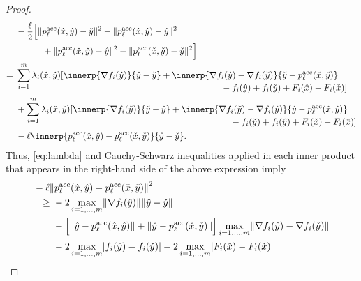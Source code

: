 \documentclass[../main]{subfiles}
\begin{document}
\begin{proof}
\begin{align}
             &- \frac{\ell}{2} 
             \begin{multlined}[t]
                 \Big[  \norm{p^\acc_\ell(\hat{x}, \hat{y}) - \check{y}}^2 - \norm{p^\acc_\ell(\hat{x}, \hat{y}) - \hat{y}}^2 \\
                  + \norm{p^\acc_\ell(\check{x}, \check{y}) - \hat{y}}^2 - \norm{p^\acc_\ell(\check{x}, \check{y}) - \check{y}}^2 \Big]
             \end{multlined} \\
        ={} & \sum_{i = 1}^{m} \lambda_i(\hat{x}, \hat{y})
        \begin{multlined}[t]
            [ \innerp{\nabla f_i(\hat{y})}{\hat{y}- \check{y}} + \innerp{\nabla f_i(\hat{y}) - \nabla f_i(\check{y})}{\check{y} - p^\acc_\ell(\check{x}, \check{y})} \\
            - f_i(\hat{y}) + f_i(\check{y}) + F_i(\hat{x}) - F_i(\check{x}) ] 
        \end{multlined} \\
        &+ \sum_{i = 1}^{m} \lambda_i(\check{x}, \check{y})
        \begin{multlined}[t]
            [ \innerp{\nabla f_i(\check{y})}{\check{y}- \hat{y}} + \innerp{\nabla f_i(\check{y}) - \nabla f_i(\hat{y})}{\hat{y} - p^\acc_\ell(\hat{x}, \hat{y})} \\
            - f_i(\check{y}) + f_i(\hat{y}) + F_i(\check{x}) - F_i(\hat{x}) ]
        \end{multlined} \\
        &- \ell \innerp{p^\acc_\ell(\hat{x}, \hat{y}) - p^\acc_\ell(\check{x}, \check{y})}{\hat{y} - \check{y}}
    .\end{align}
    Thus, \cref{eq:lambda} and Cauchy-Schwarz inequalities applied in each inner product that appears in the right-hand side of the above expression imply
    \begin{align}
        \MoveEqLeft - \ell \norm*{p^\acc_\ell(\hat{x}, \hat{y}) - p^\acc_\ell(\check{x}, \check{y})}^2 \\
        \ge{} & - 2 \max_{i = 1, \dots, m} \norm{\nabla f_i(\hat{y})} \norm{\hat{y} - \check{y}} \\
              &- \Big[ \norm{\hat{y} - p^\acc_\ell(\hat{x}, \hat{y})} + \norm{\check{y} - p^\acc_\ell(\check{x}, \check{y})} \Big] \max_{i = 1, \dots, m} \norm{\nabla f_i(\hat{y}) - \nabla f_i(\check{y})} \\
              &- 2 \max_{i = 1, \dots, m} \abs{f_i(\hat{y}) - f_i(\check{y})} - 2 \max_{i = 1, \dots, m} \abs{F_i(\hat{x}) - F_i(\check{x})} \\

\end{align}
\end{proof}
\end{document}
